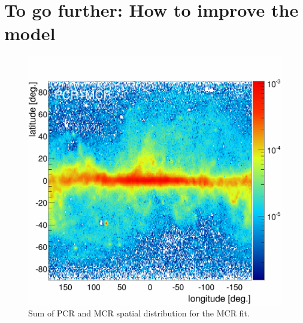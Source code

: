 \section{To go further: How to improve the model}
\label{app:PCR+MCR_distribution}
\begin{figure}[H]
  \centering
  \includegraphics[width=\linewidth]{pic/discussion/MCRonly_fine_PCR+MCR_integral_distribution.png}	 
  \caption[Skymap of the PCR and MCR sum.]{Sum of PCR and MCR spatial distribution for the MCR fit.}
  \label{app:PCR+MCR_integral_distribution}	 
\end{figure}




